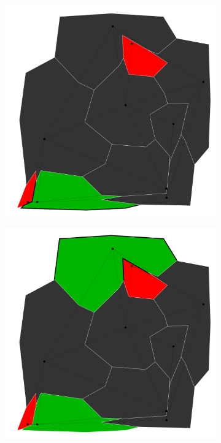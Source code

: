 \documentclass{article}
\begin{document}
\begin{figure}[h!]
\begin{subfigure}{0.18\textwidth}
				\caption{}
				\label{btb}
			\end{subfigure}
			\;
			\begin{subfigure}{0.18\textwidth}
				\centering
				\includegraphics[width=\textwidth]{images/sequences/simple_backtracking/bt_simple_I00004}
				\caption{}
				\label{btc}
			\end{subfigure}
			\;
			\begin{subfigure}{0.18\textwidth}
				\centering
				\includegraphics[width=\textwidth]{images/sequences/simple_backtracking/bt_simple_I00006}

\end{subfigure}
\end{figure}
\end{document}
